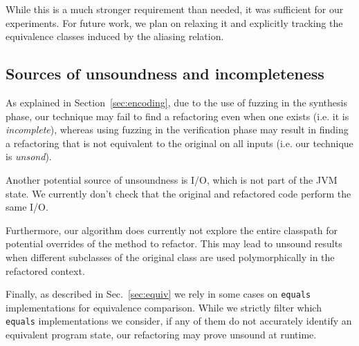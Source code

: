 \documentclass[sigconf,review,anonymous]{acmart}
\begin{document}
While this is a much stronger requirement than needed, it was sufficient for our experiments.
For future work, we plan on relaxing it and explicitly tracking the equivalence classes induced by the aliasing
relation.




\subsection{Sources of unsoundness and incompleteness}
As explained in Section~\ref{sec:encoding}, due to the use of fuzzing in the synthesis
phase, our technique may fail to find a refactoring even when one
exists (i.e. it is {\em incomplete}), whereas using fuzzing in the verification phase may result in finding a refactoring that is not equivalent to the original on all
inputs (i.e. our technique is {\em unsond}).

Another potential source of unsoundness is I/O,
which is not part of the JVM state. We currently don't check
that the original and refactored code perform the same I/O.

Furthermore, our algorithm does currently not explore the entire classpath for
potential overrides of the method to refactor. This may lead to unsound results
when different subclasses of the original class are used polymorphically in the
refactored context.

Finally, as described in Sec.~\ref{sec:equiv} we rely in some cases on
\texttt{equals} implementations for equivalence comparison.  While we
strictly filter which \texttt{equals} implementations we consider, if any of
them do not accurately identify an equivalent program state, our refactoring
may prove unsound at runtime.
\end{document}
